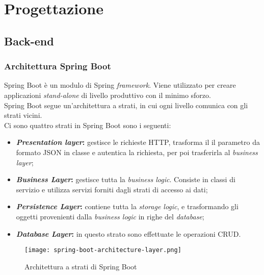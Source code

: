 \section{Progettazione}
\label{sec:progettazione}

\subsection{Back-end}
\subsubsection{Architettura Spring Boot}
Spring Boot è un modulo di Spring \textit{framework}. Viene utilizzato per creare applicazioni \textit{stand-alone} di livello produttivo con il minimo sforzo.\\
Spring Boot segue un'architettura a strati, in cui ogni livello comunica con gli strati vicini.\\
Ci sono quattro strati in Spring Boot sono i seguenti:
\begin{itemize}
    \item \textbf{\textit{Presentation layer}:} gestisce le richieste HTTP, trasforma il il parametro da formato JSON in classe e autentica la richiesta, per poi trasferirla al \textit{business layer};
    \item \textbf{\textit{Business Layer}:} gestisce tutta la \textit{business logic}. Consiste in classi di servizio e utilizza servizi forniti dagli strati di accesso ai dati;
    \item \textbf{\textit{Persistence Layer}:} contiene tutta la \textit{storage logic}, e trasformando gli oggetti provenienti dalla \textit{business logic} in righe del \textit{database};
    \item \textbf{\textit{Database Layer}:} in questo strato sono effettuate le operazioni \gls{CRUD}.
\end{itemize}
\begin{figure}[H] 
    \centering 
    \texttt{[image: spring-boot-architecture-layer.png]} 
    \caption{Architettura a strati di Spring Boot}
\end{figure}

